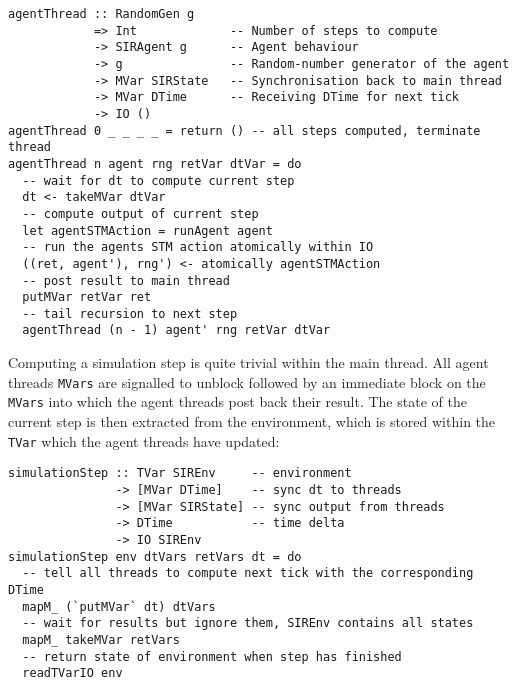 \begin{footnotesize}
\begin{verbatim}
agentThread :: RandomGen g 
            => Int             -- Number of steps to compute
            -> SIRAgent g      -- Agent behaviour 
            -> g               -- Random-number generator of the agent
            -> MVar SIRState   -- Synchronisation back to main thread
            -> MVar DTime      -- Receiving DTime for next tick
            -> IO ()
agentThread 0 _ _ _ _ = return () -- all steps computed, terminate thread
agentThread n agent rng retVar dtVar = do
  -- wait for dt to compute current step
  dt <- takeMVar dtVar
  -- compute output of current step
  let agentSTMAction = runAgent agent
  -- run the agents STM action atomically within IO
  ((ret, agent'), rng') <- atomically agentSTMAction 
  -- post result to main thread
  putMVar retVar ret
  -- tail recursion to next step 
  agentThread (n - 1) agent' rng retVar dtVar
\end{verbatim}
\end{footnotesize}

Computing a simulation step is quite trivial within the main thread. All agent threads \texttt{MVars} are signalled to unblock followed by an immediate block on the \texttt{MVars} into which the agent threads post back their result. The state of the current step is then extracted from the environment, which is stored within the \texttt{TVar} which the agent threads have updated:

\begin{footnotesize}
\begin{verbatim}
simulationStep :: TVar SIREnv     -- environment 
               -> [MVar DTime]    -- sync dt to threads
               -> [MVar SIRState] -- sync output from threads
               -> DTime           -- time delta
               -> IO SIREnv
simulationStep env dtVars retVars dt = do
  -- tell all threads to compute next tick with the corresponding DTime
  mapM_ (`putMVar` dt) dtVars
  -- wait for results but ignore them, SIREnv contains all states
  mapM_ takeMVar retVars
  -- return state of environment when step has finished
  readTVarIO env
\end{verbatim}
\end{footnotesize}
